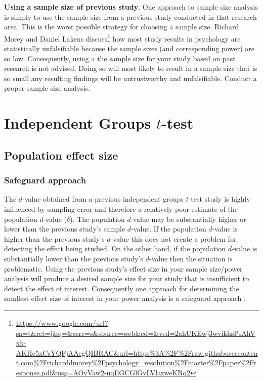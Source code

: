 \documentclass[
]{krantz}
\makeatletter
\renewcommand{\href}[2]{#2\footnote{\url{#1}}}
\newenvironment{kframe}{%
\medskip{}
\setlength{\fboxsep}{.8em}
 \def\at@end@of@kframe{}%
 \ifinner\ifhmode%
  \def\at@end@of@kframe{\end{minipage}}%
  \begin{minipage}{\columnwidth}%
 \fi\fi%
 \def\FrameCommand##1{\hskip\@totalleftmargin \hskip-\fboxsep
 \colorbox{shadecolor}{##1}\hskip-\fboxsep
     \hskip-\linewidth \hskip-\@totalleftmargin \hskip\columnwidth}%
 \MakeFramed {\advance\hsize-\width
   \@totalleftmargin\z@ \linewidth\hsize
   \@setminipage}}%
 {\par\unskip\endMakeFramed%
 \at@end@of@kframe}
\newenvironment{rmdblock}[1]
  {
  \begin{itemize}
  \renewcommand{\labelitemi}{
    \raisebox{-.7\height}[0pt][0pt]{
      {\setkeys{Gin}{width=3em,keepaspectratio}\texttt{[image: images/\#1]}}
    }
  }
  \setlength{\fboxsep}{1em}
  \begin{kframe}
  \item
  }
  {
  \end{kframe}
  \end{itemize}
  }
\newenvironment{rmdcaution}
  {\begin{rmdblock}{caution}}
  {\end{rmdblock}}
\makeatother
\begin{document}
\begin{rmdcaution}
\begin{rmdcaution}

\textbf{Using a sample size of previous study}. One approach to sample size analysis is simply to use the sample size from a previous study conducted in that research area. This is the worst possible strategy for choosing a sample size. Richard Morey and Daniel Lakens \href{https://www.google.com/url?sa=t\&rct=j\&q=\&esrc=s\&source=web\&cd=\&ved=2ahUKEwj3wvikhsPsAhVxk-AKHe5xCsYQFjAAegQIBRAC\&url=https\%3A\%2F\%2Fraw.githubusercontent.com\%2Fricharddmorey\%2Fpsychology_resolution\%2Fmaster\%2Fpaper\%2Fresponse.pdf\&usg=AOvVaw2-uqEGCGlGvLVlazweKRq2}{discuss} how most study results in psychology are statistically unfalsifiable because the sample sizes (and corresponding power) are so low. Consequently, using a the sample size for your study based on past research is not advised. Doing so will most likely to result in a sample size that is so small any resulting findings will be untrustworthy and unfalsifiable. Conduct a proper sample size analysis.

\end{rmdcaution}
\end{rmdcaution}

\hypertarget{independent-groups-t-test}{%
\section{\texorpdfstring{Independent Groups \(t\)-test}{Independent Groups t-test}}\label{independent-groups-t-test}}

\hypertarget{population-effect-size}{%
\subsection{Population effect size}\label{population-effect-size}}

\hypertarget{safeguard-approach}{%
\subsubsection{Safeguard approach}\label{safeguard-approach}}

The \(d\)-value obtained from a previous independent groups \(t\)-test study is highly influenced by sampling error and therefore a relatively poor estimate of the population \(d\)-value (\(\delta\)). The population \(d\)-value may be substantially higher or lower than the previous study's sample \(d\)-value. If the population \(d\)-value is higher than the previous study's \(d\)-value this does not create a problem for detecting the effect being studied. On the other hand, if the population \(d\)-value is substantially lower than the previous study's \(d\)-value then the situation is problematic. Using the previous study's effect size in your sample size/power analysis will produce a desired sample size for your study that is insufficient to detect the effect of interest. Consequently one approach for determining the smallest effect size of interest in your power analysis is a safeguard approach \citep{perugini2014safeguard}.
\end{document}
